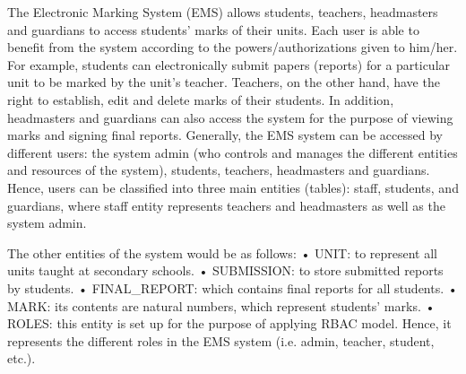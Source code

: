 The Electronic Marking System (EMS) allows students, teachers, headmasters and guardians to access students’ marks of their units.  Each user is able to benefit from the system according to the powers/authorizations given to him/her.  For example, students can electronically submit papers (reports) for a particular unit to be marked by the unit’s teacher.  Teachers, on the other hand, have the right to establish, edit and delete marks of their students.  In addition, headmasters and guardians can also access the system for the purpose of viewing marks and signing final reports.  
     Generally, the EMS system can be accessed by different users: the system admin (who controls and manages the different entities and resources of the system), students, teachers, headmasters and guardians.  Hence, users can be classified into three main entities (tables): staff, students, and guardians, where staff entity represents teachers and headmasters as well as the system admin.
     
     The other entities of the system would be as follows:
•	UNIT: to represent all units taught at secondary schools. 
•	SUBMISSION: to store submitted reports by students. 
•	FINAL\_REPORT: which contains final reports for all students. 
•	MARK: its contents are natural numbers, which represent students’ marks. 
•	ROLES: this entity is set up for the purpose of applying RBAC model.  Hence, it represents the different roles in the EMS system (i.e. admin, teacher, student, etc.).

